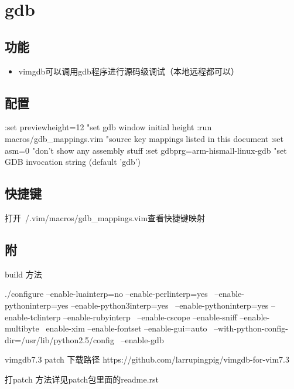 \chapter{gdb}

\section{功能}
\begin{itemize}
    \item vimgdb可以调用gdb程序进行源码级调试（本地远程都可以）
\end{itemize}

\section{配置}
\begin{code}
:set previewheight=12 "set gdb window initial height
:run macros/gdb_mappings.vim "source key mappings listed in 
this document
:set asm=0 "don't show any assembly stuff
:set gdbprg=arm-hismall-linux-gdb "set GDB invocation 
string (default 'gdb')
\end{code}

\section{快捷键}
打开~/.vim/macros/gdb\_mappings.vim查看快捷键映射

\section{附}
build 方法

\begin{code}
./configure --enable-luainterp=no --enable-perlinterp=yes \
--enable-pythoninterp=yes --enable-python3interp=yes \
--enable-pythoninterp=yes --enable-tclinterp --enable-rubyinterp \
--enable-cscope --enable-sniff --enable-multibyte \
enable-xim --enable-fontset --enable-gui=auto \
--with-python-config-dir=/usr/lib/python2.5/config \
--enable-gdb
\end{code}

vimgdb7.3 patch 下载路径
https://github.com/larrupingpig/vimgdb-for-vim7.3

打patch 方法详见patch包里面的readme.rst

\newpage
